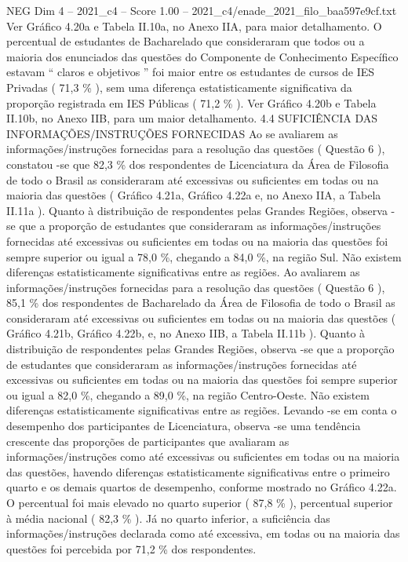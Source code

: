 \begin{textsample}{NEG Dim 4 – 2021\_c4 – Score 1.00 – 2021\_c4/enade\_2021\_filo\_baa597e9cf.txt}
Ver Gráfico 4.20a e Tabela II.10a, no Anexo IIA, para maior detalhamento.
O percentual de estudantes de Bacharelado que consideraram que todos ou a maioria dos enunciados das questões do Componente de Conhecimento Específico estavam “ claros e objetivos ” foi maior entre os estudantes de cursos de IES Privadas ( 71,3 \% ), sem uma diferença estatisticamente significativa da proporção registrada em IES Públicas ( 71,2 \% ).
Ver Gráfico 4.20b e Tabela II.10b, no Anexo IIB, para um maior detalhamento. 4.4 SUFICIÊNCIA DAS INFORMAÇÕES/INSTRUÇÕES FORNECIDAS Ao se avaliarem as informações/instruções fornecidas para a resolução das questões ( Questão 6 ), constatou -se que 82,3 \% dos respondentes de Licenciatura da Área de Filosofia de todo o Brasil as consideraram até excessivas ou suficientes em todas ou na maioria das questões ( Gráfico 4.21a, Gráfico 4.22a e, no Anexo IIA, a Tabela II.11a ).
Quanto à distribuição de respondentes pelas Grandes Regiões, observa -se que a proporção de estudantes que consideraram as informações/instruções fornecidas até excessivas ou suficientes em todas ou na maioria das questões foi sempre superior ou igual a 78,0 \%, chegando a 84,0 \%, na região Sul.
Não existem diferenças estatisticamente significativas entre as regiões.
Ao avaliarem as informações/instruções fornecidas para a resolução das questões ( Questão 6 ), 85,1 \% dos respondentes de Bacharelado da Área de Filosofia de todo o Brasil as consideraram até excessivas ou suficientes em todas ou na maioria das questões ( Gráfico 4.21b, Gráfico 4.22b, e, no Anexo IIB, a Tabela II.11b ).
Quanto à distribuição de respondentes pelas Grandes Regiões, observa -se que a proporção de estudantes que consideraram as informações/instruções fornecidas até excessivas ou suficientes em todas ou na maioria das questões foi sempre superior ou igual a 82,0 \%, chegando a 89,0 \%, na região Centro-Oeste.
Não existem diferenças estatisticamente significativas entre as regiões.
Levando -se em conta o desempenho dos participantes de Licenciatura, observa -se uma tendência crescente das proporções de participantes que avaliaram as informações/instruções como até excessivas ou suficientes em todas ou na maioria das questões, havendo diferenças estatisticamente significativas entre o primeiro quarto e os demais quartos de desempenho, conforme mostrado no Gráfico 4.22a.
O percentual foi mais elevado no quarto superior ( 87,8 \% ), percentual superior à média nacional ( 82,3 \% ).
Já no quarto inferior, a suficiência das informações/instruções declarada como até excessiva, em todas ou na maioria das questões foi percebida por 71,2 \% dos respondentes.

\end{textsample}
